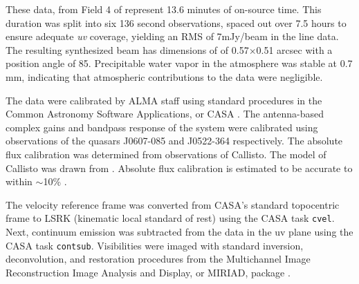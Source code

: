 



These data, from Field 4 of \citet{Mann2014} represent 13.6 minutes of on-source time. This duration was split into six 136 second observations, spaced out over 7.5 hours to ensure adequate \textit{uv} coverage, yielding an RMS of 7mJy/beam in the line data. The resulting synthesized beam has dimensions of of 0.57$\times$0.51 arcsec with a position angle of 85\degree. Precipitable water vapor in the atmosphere was stable at 0.7 mm, indicating that atmospheric contributions to the data were negligible.


The data were calibrated by ALMA staff using standard procedures in the Common Astronomy Software Applications, or CASA \citep{McMullin2007}. The antenna-based complex gains and bandpass response of the system were calibrated using observations of the quasars J0607-085 and J0522-364 respectively. The absolute flux calibration was determined from observations of Callisto. The model of Callisto was drawn from \citet{Butler2012}. Absolute flux calibration is estimated to be accurate to within $\sim$10\% \citep{Mann2014}.



The velocity reference frame was converted from CASA's standard topocentric frame to LSRK (kinematic local standard of rest) using the CASA task \texttt{cvel}. Next, continuum emission was subtracted from the data in the uv plane using the CASA task \texttt{contsub}. Visibilities were imaged with standard inversion, deconvolution, and restoration procedures from the Multichannel Image Reconstruction Image Analysis and Display, or MIRIAD, package \citep{Sault1995}.

